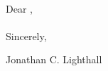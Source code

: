 \pagestyle{empty}
\nameaddress{\homeaddress}
\vspace*{1.0\baselineskip}%

\vspace*{2.0\baselineskip}%
\recip{}\\
\recipaddress{}
\vspace*{2.0\baselineskip}%

Dear \recip,\\

\\

Sincerely, 

\vspace*{2.0\baselineskip}%

Jonathan C. Lighthall